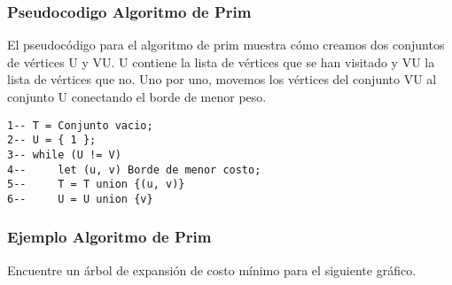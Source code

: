 \documentclass[12pt,twoside]{article}
\begin{document}
\subsubsection{Pseudocodigo Algoritmo de Prim}
El pseudocódigo para el algoritmo de prim muestra cómo creamos dos conjuntos de vértices U y VU. U contiene la lista de vértices que se han visitado y VU la lista de vértices que no. Uno por uno, movemos los vértices del conjunto VU al conjunto U conectando el borde de menor peso.\\
\begin{lstlisting}
1-- T = Conjunto vacio;
2-- U = { 1 };
3-- while (U != V)
4--     let (u, v) Borde de menor costo;
5--     T = T union {(u, v)}
6--     U = U union {v}
\end{lstlisting}
\newpage
\subsubsection{Ejemplo Algoritmo de Prim}
Encuentre un árbol de expansión de costo mínimo para el siguiente gráfico.
\end{document}
